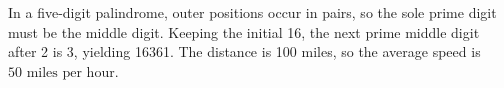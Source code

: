 In a five-digit palindrome, outer positions occur in pairs, so the sole prime digit must be the middle digit. Keeping the initial 16, the next prime middle digit after 2 is 3, yielding 16361. The distance is 100 miles, so the average speed is $\boxed{50\text{ miles per hour}}$.
